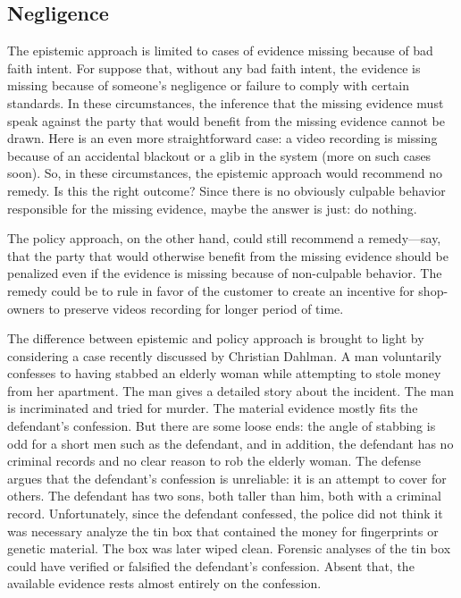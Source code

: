 \documentclass[
  10pt,
  dvipsnames,enabledeprecatedfontcommands]{scrartcl}
\begin{document}
\hypertarget{negligence}{%
\subsection{Negligence}\label{negligence}}

The epistemic approach is limited to cases of evidence missing because
of bad faith intent. For suppose that, without any bad faith intent, the
evidence is missing because of someone's negligence or failure to comply
with certain standards. In these circumstances, the inference that the
missing evidence must speak against the party that would benefit from
the missing evidence cannot be drawn. Here is an even more
straightforward case: a video recording is missing because of an
accidental blackout or a glib in the system (more on such cases soon).
So, in these circumstances, the epistemic approach would recommend no
remedy. Is this the right outcome? Since there is no obviously culpable
behavior responsible for the missing evidence, maybe the answer is just:
do nothing.

The policy approach, on the other hand, could still recommend a
remedy---say, that the party that would otherwise benefit from the
missing evidence should be penalized even if the evidence is missing
because of non-culpable behavior. The remedy could be to rule in favor
of the customer to create an incentive for shop-owners to preserve
videos recording for longer period of time.

The difference between epistemic and policy approach is brought to light
by considering a case recently discussed by Christian Dahlman. A man
voluntarily confesses to having stabbed an elderly woman while
attempting to stole money from her apartment. The man gives a detailed
story about the incident. The man is incriminated and tried for murder.
The material evidence mostly fits the defendant's confession. But there
are some loose ends: the angle of stabbing is odd for a short men such
as the defendant, and in addition, the defendant has no criminal records
and no clear reason to rob the elderly woman. The defense argues that
the defendant's confession is unreliable: it is an attempt to cover for
others. The defendant has two sons, both taller than him, both with a
criminal record. Unfortunately, since the defendant confessed, the
police did not think it was necessary analyze the tin box that contained
the money for fingerprints or genetic material. The box was later wiped
clean. Forensic analyses of the tin box could have verified or falsified
the defendant's confession. Absent that, the available evidence rests
almost entirely on the confession.
\end{document}
